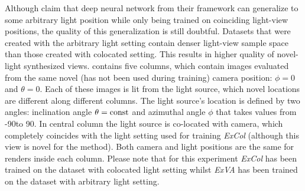 Although \cite{bi2020neural} claim that deep neural network from their framework
can generalize to some arbitrary light position while only being trained on coinciding light-view positions,
the quality of this generalization is still doubtful.
Datasets that were created with the arbitrary light setting
contain denser light-view sample space than those created with colocated setting.
This results in higher quality of novel-light synthesized views.
 contains five columns,
which contain images evaluated from the same novel (has not been used during training) camera position: $\phi = 0$ and $\theta = 0$.
Each of these images is lit from the light source,
which novel locations are different along different columns.
The light source's location is defined by two angles:
inclination angle $\theta = \mathrm{const}$ and azimuthal angle $\phi$
that takes values from -90\textdegree to 90\textdegree.
In central column the light source is co-located with camera,
which completely coincides with the light setting used for training \textit{ExCol}
(although this view is novel for the method).
Both camera and light positions are the same for renders inside each column.
Please note that for this experiment \textit{ExCol} has been trained on the dataset with colocated light setting
whilst \textit{ExVA} has been trained on the dataset with arbitrary light setting.

